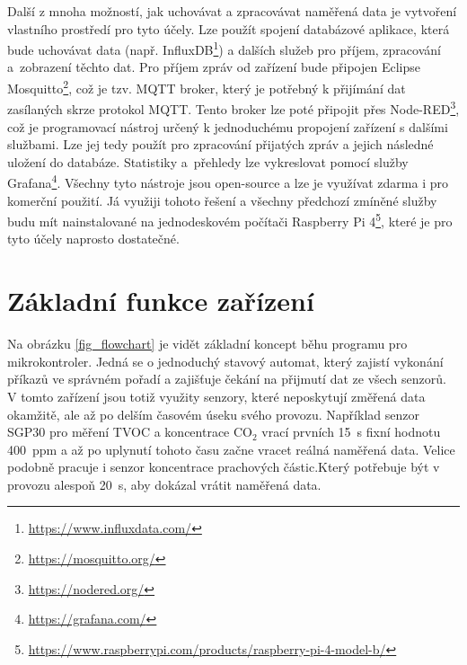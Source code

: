 Další z mnoha možností, jak uchovávat a zpracovávat naměřená data je vytvoření vlastního prostředí pro tyto účely. Lze použít spojení databázové aplikace, která bude uchovávat data (např. InfluxDB\footnote{\url{https://www.influxdata.com/}}) a dalších služeb pro příjem, zpracování a~zobrazení těchto dat. Pro příjem zpráv od zařízení bude připojen Eclipse Mosquitto\footnote{\url{https://mosquitto.org/}}, což je tzv. MQTT broker, který je potřebný k přijímání dat zasílaných skrze protokol MQTT. Tento broker lze poté připojit přes Node-RED\footnote{\url{https://nodered.org/}}, což je programovací nástroj určený k jednoduchému propojení zařízení s dalšími službami. Lze jej tedy použít pro zpracování přijatých zpráv a jejich následné uložení do databáze. Statistiky a~přehledy lze vykreslovat pomocí služby Grafana\footnote{\url{https://grafana.com/}}. Všechny tyto nástroje jsou open-source a lze je využívat zdarma i pro komerční použití. Já využiji tohoto řešení a všechny předchozí zmíněné služby budu mít nainstalované na jednodeskovém počítači Raspberry Pi 4\footnote{\url{https://www.raspberrypi.com/products/raspberry-pi-4-model-b/}}, které je pro tyto účely naprosto dostatečné.

\section{Základní funkce zařízení}

Na obrázku \ref{fig_flowchart} je vidět základní koncept běhu programu pro mikrokontroler. Jedná se o jednoduchý stavový automat, který zajistí vykonání příkazů ve správném pořadí a zajišťuje čekání na přijmutí dat ze všech senzorů. V tomto zařízení jsou totiž využity senzory, které neposkytují změřená data okamžitě, ale až po delším časovém úseku svého provozu. Například senzor SGP30 pro měření TVOC a koncentrace CO$_2$ vrací prvních \SI{15}{\second} fixní hodnotu 400~ppm a až po uplynutí tohoto času začne vracet reálná naměřená data. Velice podobně pracuje i senzor koncentrace prachových částic.Který potřebuje být v provozu alespoň \SI{20}{\second}, aby dokázal vrátit naměřená data.

